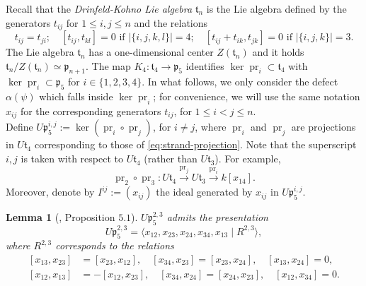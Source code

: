 \documentclass[a4paper,fleqn]{cas-sc}
\newtheorem{lemma}[theorem]{Lemma}
\DeclareMathOperator{\pr}{pr}
\begin{document}
Recall that the \textit{Drinfeld-Kohno Lie algebra} $\mathfrak{t}_n$ is the Lie algebra defined by the generators $t_{ij}$ for $1\le i,j\le n$ and the relations 
$$
t_{ij}=t_{ji}; \quad [t_{ij},t_{kl}]=0 \text{ if } \lvert \{i,j,k,l\} \rvert =4 ; \quad [t_{ij}+t_{ik},t_{jk}]=0 \text{ if } \lvert \{i,j,k\} \rvert =3.
$$
The Lie algebra $\mathfrak{t}_n$ has a one-dimensional center $Z(\mathfrak{t}_n)$ and it holds $\mathfrak{t}_n/Z(\mathfrak{t}_n)\simeq \mathfrak{p}_{n+1}$. The map $K_4 : \mathfrak{t}_4 \to \mathfrak{p}_5$ identifies $ \ker \pr_i\subset \mathfrak{t}_4$ with $ \ker \pr_i\subset \mathfrak{p}_5$ for $i \in \{1,2,3,4\}$. In what follows, we only consider the defect $\alpha(\psi)$ which falls inside $\ker \pr_i$; for convenience, we will use the same notation $x_{ij}$ for the corresponding generators $t_{ij}$, for $1\le i<j\le n$.  \\

Define $U\mathfrak{p}^{i,j}_5 := \ker (\pr_i\circ \pr_j)$, for $i\ne j$, where $\pr_i$ and $\pr_j$ are projections in $U\mathfrak{t}_4$ corresponding to those of \eqref{eq:strand-projection}. Note that the superscript $i,j$ is taken with respect to $U\mathfrak{t}_4$ (rather than $U\mathfrak{t}_3$). For example,
$$
\pr_2\circ\pr_3: U\mathfrak{t}_4\xrightarrow{\pr_j} U\mathfrak{t}_3\xrightarrow{\pr_i}k[x_{14}].
$$
Moreover, denote by $I^{ij}:=(x_{ij})$ the ideal generated by $x_{ij}$ in $U\mathfrak{p}^{i,j}_5$.


\begin{lemma}[\cite{ANR}, Proposition $5.1$]\label{eq:4T_relations}
$U\mathfrak{p}^{2,3}_5$ admits the presentation
	\begin{equation*}
	U\mathfrak{p}^{2,3}_5=\langle x_{12},x_{23},x_{24},x_{34},x_{13} \mid R^{2,3} \rangle,
    \end{equation*}
where $R^{2,3}$ corresponds to the relations
\begin{equation*}
\label{eq:4T-relations}
\begin{split}
	[x_{13},x_{23}] &=[x_{23},x_{12}], \quad [x_{34},x_{23}]=[x_{23},x_{24}], \quad [x_{13},x_{24}]=0, \\
	[x_{12},x_{13}] &=-[x_{12},x_{23}], \quad [x_{34},x_{24}]=[x_{24},x_{23}], \quad [x_{12},x_{34}]=0.
\end{split}
\end{equation*}	
\end{lemma}
\end{document}
